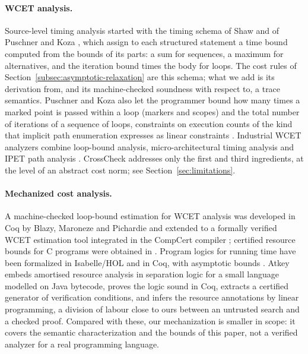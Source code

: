 \documentclass[oneside,english]{amsart}
\numberwithin{equation}{section}
\numberwithin{figure}{section}
\theoremstyle{plain}
\theoremstyle{definition}
\theoremstyle{plain}
\theoremstyle{remark}
\theoremstyle{plain}
\theoremstyle{definition}
\theoremstyle{plain}
\theoremstyle{remark}
\begin{document}
\paragraph{WCET analysis.}
Source-level timing analysis started with the timing schema of Shaw \cite{shaw1989reasoning} and of Puschner and Koza
\cite{puschner1989calculating}, which assign to each structured statement a time bound computed from the bounds of its
parts: a sum for sequences, a maximum for alternatives, and the iteration bound times the body for loops. The cost
rules of Section~\ref{subsec:asymptotic-relaxation} are this schema; what we add is its derivation from, and its
machine-checked soundness with respect to, a trace semantics. Puschner and Koza also let the programmer bound how many times a marked point is passed within a loop (markers and scopes) and the total number of iterations of a sequence of loops, constraints on execution counts of the kind that implicit path enumeration expresses as linear constraints \cite{li1995ilp}.
Industrial WCET analyzers combine loop-bound analysis, micro-architectural timing analysis and IPET path analysis
\cite{wilhelm2008worst,li1995ilp}. CrossCheck addresses only the first and third ingredients, at the level of an abstract
cost norm; see Section~\ref{sec:limitations}.

\paragraph{Mechanized cost analysis.}
A machine-checked loop-bound estimation for WCET analysis was developed
in Coq by Blazy, Maroneze and Pichardie \cite{blazy2013formal} and extended to a formally verified WCET estimation tool
integrated in the CompCert compiler \cite{maroneze2014formally}; certified resource bounds for C programs were obtained
in \cite{carbonneaux2015compositional}. Program logics for running time have been formalized in Isabelle/HOL
\cite{haslbeck2018hoare} and in Coq, with asymptotic bounds \cite{gueneau2018fistful}. Atkey \cite{atkey2010amortised} embeds amortised resource analysis in separation logic for a small language modelled on Java bytecode, proves the logic sound in Coq, extracts a certified generator of verification conditions, and infers the resource annotations by linear programming, a division of labour close to ours between an untrusted search and a checked proof. Compared with these, our
mechanization is smaller in scope: it covers the semantic characterization and the bounds of this paper, not a
verified analyzer for a real programming language.
\end{document}

